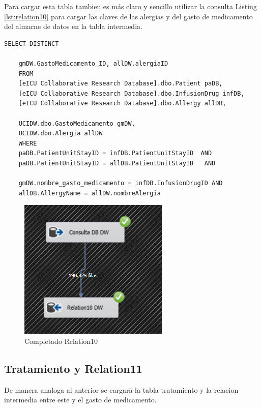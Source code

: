 \documentclass{article}
\begin{document}
	Para cargar esta tabla tambien es más claro y sencillo utilizar la consulta Listing \ref{lst:relation10} para cargar las claves de las alergias y del gasto de medicamento del almacne de datos en la tabla intermedia.
	\begin{lstlisting}[style=ddlstyle, label=lst:relation10,caption=Consulta para llenado de relacion 10]
		SELECT DISTINCT
	
	gmDW.GastoMedicamento_ID, allDW.alergiaID
	FROM 
	[eICU Collaborative Research Database].dbo.Patient paDB,
	[eICU Collaborative Research Database].dbo.InfusionDrug infDB,
	[eICU Collaborative Research Database].dbo.Allergy allDB,
	
	UCIDW.dbo.GastoMedicamento gmDW,
	UCIDW.dbo.Alergia allDW
	WHERE 
	paDB.PatientUnitStayID = infDB.PatientUnitStayID  AND 
	paDB.PatientUnitStayID = allDB.PatientUnitStayID   AND
	
	gmDW.nombre_gasto_medicamento = infDB.InfusionDrugID AND
	allDB.AllergyName = allDW.nombreAlergia 
	\end{lstlisting}

	
	
	
	
	\begin{figure}[H]
		\centering
		\includegraphics[width=.3\linewidth]{./images/completados/relation10.png}
		\caption{Completado Relation10}
	\end{figure}
	\subsection{Tratamiento y Relation11}
	De manera analoga al anterior se cargará la tabla tratamiento y la relacion intermedia entre este y el gasto de medicamento.
\end{document}
